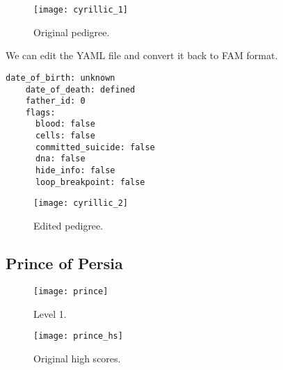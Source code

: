 \documentclass[slidestop]{beamer}
\begin{document}
\begin{pframe}
  \begin{figure}[]
    \begin{center}
      \texttt{[image: cyrillic\_1]}
    \end{center}
    \caption{Original pedigree.}
  \end{figure}
\end{pframe}

\begin{pframe}
  We can edit the YAML file and convert it back to FAM format.
  \begin{lstlisting}[language=none, caption={Updating date of death field.}]
    date_of_birth: unknown
    date_of_death: defined
    father_id: 0
    flags:
      blood: false
      cells: false
      committed_suicide: false
      dna: false
      hide_info: false
      loop_breakpoint: false
  \end{lstlisting}
\end{pframe}

\begin{pframe}
  \begin{figure}[]
    \begin{center}
      \texttt{[image: cyrillic\_2]}
    \end{center}
    \caption{Edited pedigree.}
  \end{figure}
\end{pframe}

\subsection{Prince of Persia}
\begin{pframe}
  \begin{figure}[]
    \begin{center}
      \texttt{[image: prince]}
    \end{center}
    \caption{Level 1.}
  \end{figure}
\end{pframe}

\begin{pframe}
  \begin{figure}[]
    \begin{center}
      \texttt{[image: prince\_hs]}
    \end{center}
    \caption{Original high scores.}
  \end{figure}
\end{pframe}
\end{document}
